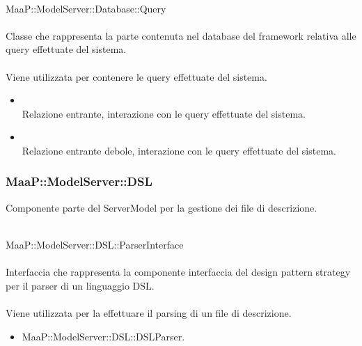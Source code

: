 	\\
	MaaP::ModelServer::Database::Query\\
	\\
	Classe che rappresenta la parte contenuta nel database del framework relativa alle query effettuate del sistema.\\
	\\
	Viene utilizzata per contenere le query effettuate del sistema.\\
	\begin{itemize}
	\item{}\\
	Relazione entrante, interazione con le query effettuate del sistema.
	\item{}\\
	Relazione entrante debole, interazione con le query effettuate del sistema.
	\end{itemize}
	

\subsubsection{MaaP::ModelServer::DSL}
Componente parte del ServerModel per la gestione dei file di descrizione.

	\\
	MaaP::ModelServer::DSL::ParserInterface\\
	\\
	Interfaccia che rappresenta la componente interfaccia del design pattern strategy per il parser di un linguaggio DSL.\\
	\\
	Viene utilizzata per la effettuare il parsing di un file di descrizione.\\
	\begin{itemize}
	\item MaaP::ModelServer::DSL::DSLParser.
	\end{itemize}
		
